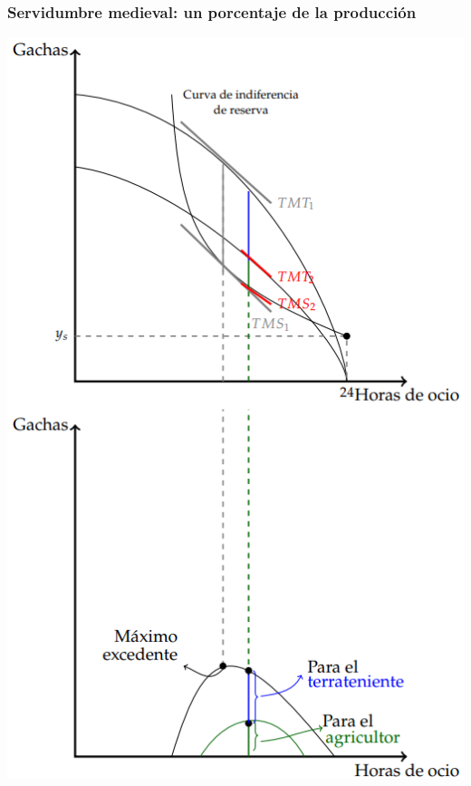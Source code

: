 \documentclass{beamer}
\begin{document}
\begin{frame}
\frametitle{Servidumbre medieval: un porcentaje de la producción}
\centering
\includegraphics[scale=0.45]{../Figures/C19.13.png}
\end{frame}
\end{document}
